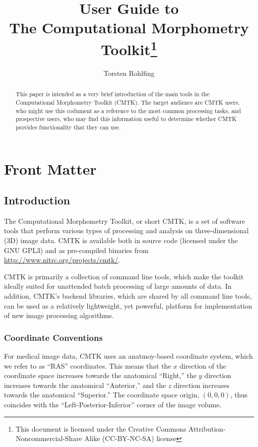 \documentclass{InsightArticle}
\title{User Guide to \\[4mm] The Computational Morphometry
  Toolkit\footnote{This document is licensed under
    the Creative Commons Attribution-Noncommercial-Share Alike (CC-BY-NC-SA) license}}
\author{Torsten Rohlfing}
\begin{document}
\maketitle

\ifhtml
\chapter*{Front Matter\label{front}}
\fi


\begin{abstract}
\noindent
This paper is intended as a very brief introduction of the main tools in the
Computational Morphometry Toolkit (CMTK). The target audience are CMTK users,
who might use this codument as a reference to the most common processing
tasks, and prospective users, who may find this information useful to
determine whether CMTK provides functionality that they can use.
\end{abstract}

\clearpage
\tableofcontents
\clearpage


\section{Introduction}

The Computational Morphometry Toolkit, or short CMTK, is a set of software
tools that perform various types of processing and analysis on
three-dimensional (3D) image data. CMTK is available both in source code
(licensed under the GNU GPL3) and as pre-compiled binaries from
\url{http://www.nitrc.org/projects/cmtk/}.

CMTK is primarily a collection of command line tools, which make the toolkit
ideally suited for unattended batch processing of large amounts of data. In
addition, CMTK's backend libraries, which are shared by all command line
tools, can be used as a relatively lightweight, yet powerful, platform for
implementation of new image processing algorithms.

\subsection{Coordinate Conventions}

For medical image data, CMTK uses an anatmoy-based coordinate system, which we
refer to as ``RAS'' coordinates. This means that the $x$ direction of the
coordinate space increases towards the anatomical ``Right,'' the $y$ direction
increases towards the anatomical ``Anterior,'' and the $z$ direction increases
towards the anatomical ``Superior.'' The coordinate space origin, $(0,0,0)$,
thus coincides with the ``Left-Posterior-Inferior'' corner of the image
volume. 
\end{document}
